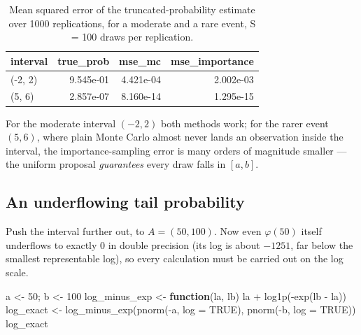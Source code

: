 \documentclass[
  letterpaper,
  DIV=11,
  numbers=noendperiod]{scrreprt}
\newenvironment{Shaded}{\begin{snugshade}}{\end{snugshade}}
\newcommand{\AttributeTok}[1]{\textcolor[rgb]{0.40,0.45,0.13}{#1}}
\newcommand{\ConstantTok}[1]{\textcolor[rgb]{0.56,0.35,0.01}{#1}}
\newcommand{\ControlFlowTok}[1]{\textcolor[rgb]{0.00,0.23,0.31}{\textbf{#1}}}
\newcommand{\DecValTok}[1]{\textcolor[rgb]{0.68,0.00,0.00}{#1}}
\newcommand{\FunctionTok}[1]{\textcolor[rgb]{0.28,0.35,0.67}{#1}}
\newcommand{\NormalTok}[1]{\textcolor[rgb]{0.00,0.23,0.31}{#1}}
\newcommand{\OtherTok}[1]{\textcolor[rgb]{0.00,0.23,0.31}{#1}}
\newcommand{\SpecialCharTok}[1]{\textcolor[rgb]{0.37,0.37,0.37}{#1}}
\begin{document}
{

\begin{longtable}[]{@{}lrrr@{}}

\caption{\label{tbl-tail-good}Mean squared error of the
truncated-probability estimate over 1000 replications, for a moderate
and a rare event, S = 100 draws per replication.}

\tabularnewline

\toprule\noalign{}
interval & true\_prob & mse\_mc & mse\_importance \\
\midrule\noalign{}
\endhead
\bottomrule\noalign{}
\endlastfoot
(-2, 2) & 9.545e-01 & 4.421e-04 & 2.002e-03 \\
(5, 6) & 2.857e-07 & 8.160e-14 & 1.295e-15 \\

\end{longtable}

}

For the moderate interval \((-2,2)\) both methods work; for the rarer
event \((5,6)\), where plain Monte Carlo almost never lands an
observation inside the interval, the importance-sampling error is many
orders of magnitude smaller --- the uniform proposal \emph{guarantees}
every draw falls in \([a,b]\).

\subsection{An underflowing tail
probability}\label{an-underflowing-tail-probability}

Push the interval further out, to \(A = (50,100)\). Now even
\(\varphi(50)\) itself underflows to exactly \(0\) in double precision
(its log is about \(-1251\), far below the smallest representable log),
so every calculation must be carried out on the log scale.

\begin{Shaded}
\begin{Highlighting}[]
\NormalTok{a }\OtherTok{\textless{}{-}} \DecValTok{50}\NormalTok{; b }\OtherTok{\textless{}{-}} \DecValTok{100}
\NormalTok{log\_minus\_exp }\OtherTok{\textless{}{-}} \ControlFlowTok{function}\NormalTok{(la, lb) la }\SpecialCharTok{+} \FunctionTok{log1p}\NormalTok{(}\SpecialCharTok{{-}}\FunctionTok{exp}\NormalTok{(lb }\SpecialCharTok{{-}}\NormalTok{ la))}
\NormalTok{log\_exact }\OtherTok{\textless{}{-}} \FunctionTok{log\_minus\_exp}\NormalTok{(}\FunctionTok{pnorm}\NormalTok{(}\SpecialCharTok{{-}}\NormalTok{a, }\AttributeTok{log =} \ConstantTok{TRUE}\NormalTok{), }\FunctionTok{pnorm}\NormalTok{(}\SpecialCharTok{{-}}\NormalTok{b, }\AttributeTok{log =} \ConstantTok{TRUE}\NormalTok{))}
\NormalTok{log\_exact}
\end{Highlighting}
\end{Shaded}
\end{document}
